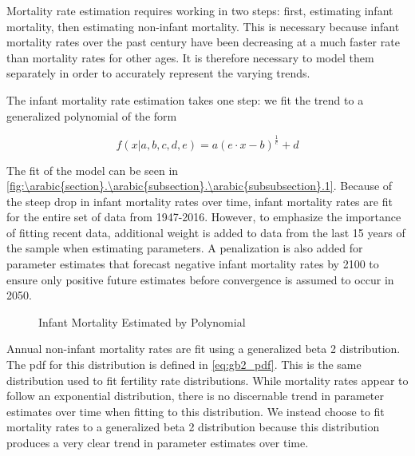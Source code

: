 \documentclass[10pt]{article}
\renewcommand{\thesection}{\arabic{section}}
\renewcommand{\thesubsection}{\thesection.\arabic{subsection}}
\renewcommand{\thesubsubsection}{\thesubsection.\arabic{subsubsection}}
\numberwithin{equation}{subsection}
\newcommand*{\FigureDir}{../../graphs}
\begin{document}
\par Mortality rate estimation requires working in two steps: first, estimating infant mortality, then estimating non-infant mortality. This is necessary because infant mortality rates over the past century have been decreasing at a much faster rate than mortality rates for other ages. It is therefore necessary to model them separately in order to accurately represent the varying trends.

\par The infant mortality rate estimation takes one step: we fit the trend to a generalized polynomial of the form

\begin{equation}
   f(x|a, b, c, d, e) = a (e \cdot x - b)^{\frac{1}{c}} + d
\end{equation}

\par The fit of the model can be seen in \autoref{fig:\thesubsubsection.1}. Because of the steep drop in infant mortality rates over time, infant mortality rates are fit for the entire set of data from 1947-2016. However, to emphasize the importance of fitting recent data, additional weight is added to data from the last 15 years of the sample when estimating parameters. A penalization is also added for parameter estimates that forecast negative infant mortality rates by 2100 to ensure only positive future estimates before convergence is assumed to occur in 2050.

\begin{figure}[!ht]
   \centering
   \caption{\label{fig:\thesubsubsection.1}Infant Mortality Estimated by Polynomial}
\end{figure}

\par Annual non-infant mortality rates are fit using a generalized beta 2 distribution. The pdf for this distribution is defined in \ref{eq:gb2_pdf}. This is the same distribution used to fit fertility rate distributions. While mortality rates appear to follow an exponential distribution, there is no discernable trend in parameter estimates over time when fitting to this distribution. We instead choose to fit mortality rates to a generalized beta 2 distribution because this distribution produces a very clear trend in parameter estimates over time.
\end{document}
